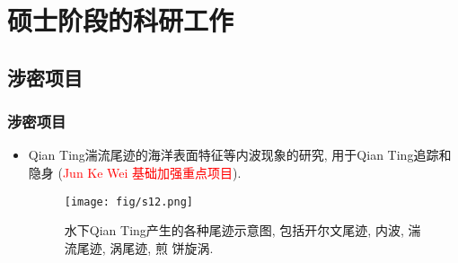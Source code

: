 \documentclass[UTF8]{ctexbeamer}	%
\theoremstyle{plain}
\theoremstyle{definition}
\theoremstyle{remark}
\numberwithin{equation}{section}
\begin{document}

\section{硕士阶段的科研工作}
\subsection{涉密项目}
\begin{frame}
    \frametitle{涉密项目}
    \begin{itemize}
        \item Qian Ting湍流尾迹的海洋表面特征等内波现象的研究, 用于Qian Ting追踪和隐身
              (\textcolor{red}{Jun Ke Wei
                  基础加强重点项目}).
              \begin{figure}
                  \texttt{[image: fig/s12.png]}
                  \caption{水下Qian Ting产生的各种尾迹示意图, 包括开尔文尾迹, 内波, 湍流尾迹, 涡尾迹, 煎
                      饼旋涡.}
              \end{figure}
    \end{itemize}
\end{frame}
\end{document}
